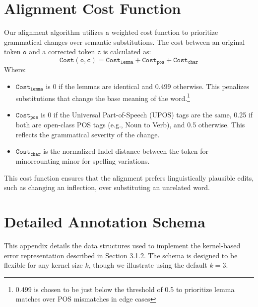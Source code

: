 \documentclass[11pt]{article}
\begin{document}
\begin{appendices}
\section{Alignment Cost Function}
\label{sec:Alignment_Cost_Function}
Our alignment algorithm utilizes a weighted cost function to prioritize grammatical changes over semantic substitutions. The cost between an original token \(\texttt{o}\) and a corrected token \(\texttt{c}\) is calculated as:
\vspace{-0.25cm}
\[ \texttt{Cost}(\texttt{o}, \texttt{c}) = \texttt{Cost}_{\texttt{lemma}} + \texttt{Cost}_{\texttt{pos}} + \texttt{Cost}_{\texttt{char}} \]
\vspace{-0.25cm}
Where:
\begin{itemize}
\setlength{\itemsep}{0pt}  %
  \setlength{\parskip}{0pt}  %
  \setlength{\topsep}{0pt} 
    \item \textbf{\(\texttt{Cost}_{\texttt{lemma}}\)} is 0 if the lemmas are identical and 0.499 otherwise. This penalizes substitutions that change the base meaning of the word.\footnote{0.499 is chosen to be just below the threshold of 0.5 to prioritize lemma matches over POS mismatches in edge cases}
    \item \textbf{\(\texttt{Cost}_{\texttt{pos}}\)} is 0 if the Universal Part-of-Speech (UPOS) tags are the same, 0.25 if both are open-class POS tags (e.g., Noun to Verb), and 0.5 otherwise. This reflects the grammatical severity of the change.
    \item \textbf{\(\texttt{Cost}_{\texttt{char}}\)} is the normalized Indel distance between the token for minorcounting minor for spelling variations.
\end{itemize}
This cost function ensures that the alignment prefers linguistically plausible edits, such as changing an inflection, over substituting an unrelated word.

\section{Detailed Annotation Schema}
\label{sec:Annotation_Schema}

This appendix details the data structures used to implement the kernel-based error representation described in Section 3.1.2. The schema is designed to be flexible for any kernel size $k$, though we illustrate using the default $k=3$.


\end{appendices}
\end{document}
